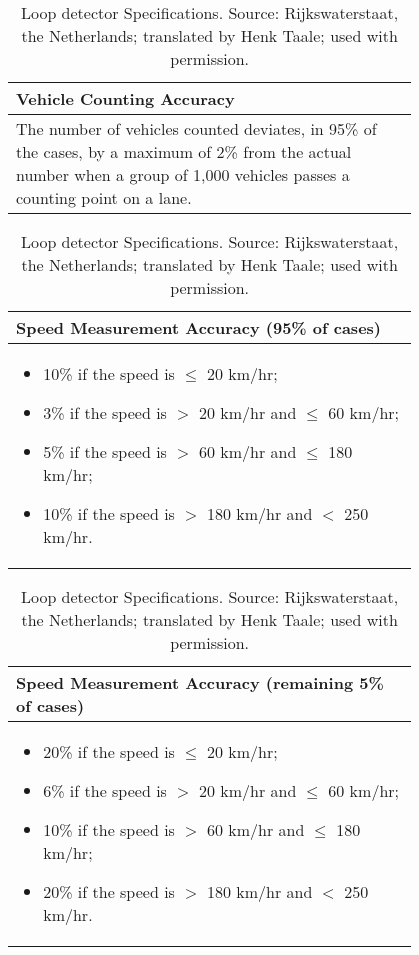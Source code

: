 \begin{table}[htp]
\centering
\begin{tabular}{p{0.8\linewidth}}
\toprule
\textbf{Vehicle Counting Accuracy} \\
\midrule
The number of vehicles counted deviates, in 95\% of the cases, by a maximum of 2\% from the actual number when a group of 1,000 vehicles passes a counting point on a lane. \\
\bottomrule
\end{tabular}

\vspace{0.1cm}

\begin{tabular}{p{0.8\linewidth}}
\toprule
\textbf{Speed Measurement Accuracy (95\% of cases)} \\
\midrule
\begin{itemize}
    \item 10\% if the speed is $\leq$ 20 km/hr;
    \item 3\% if the speed is $>$ 20 km/hr and $\leq$ 60 km/hr;
    \item 5\% if the speed is $>$ 60 km/hr and $\leq$ 180 km/hr;
    \item 10\% if the speed is $>$ 180 km/hr and $<$ 250 km/hr.
\end{itemize} \\
\bottomrule
\end{tabular}

\vspace{0.1cm}

\begin{tabular}{p{0.8\linewidth}}
\toprule
\textbf{Speed Measurement Accuracy (remaining 5\% of cases)} \\
\midrule
\begin{itemize}
    \item 20\% if the speed is $\leq$ 20 km/hr;
    \item 6\% if the speed is $>$ 20 km/hr and $\leq$ 60 km/hr;
    \item 10\% if the speed is $>$ 60 km/hr and $\leq$ 180 km/hr;
    \item 20\% if the speed is $>$ 180 km/hr and $<$ 250 km/hr.
\end{itemize} \\
\bottomrule
\end{tabular}
\caption{Loop detector Specifications. Source: Rijkswaterstaat, the Netherlands; translated by Henk Taale; used with permission. }
    \label{Loop detector Specifications. Source: Henk Taale, used with permission}
\end{table}


